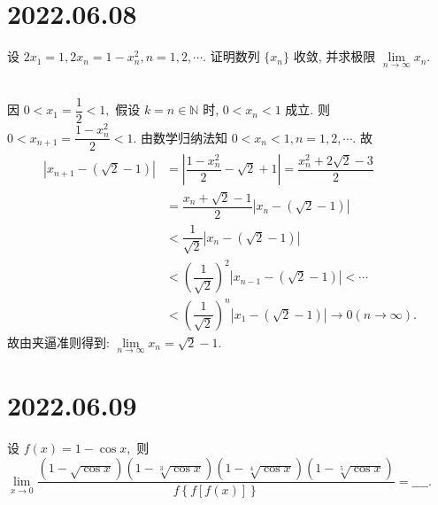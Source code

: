 \documentclass[lang=cn,12pt]{elegantbook}
\begin{document}
\newpage

\section*{2022.06.08}

设 $2x_{1} = 1, 2x_{n} = 1-x_{n}^2, n = 1, 2, \cdots.$
证明数列 $\{x_{n}\}$ 收敛, 并求极限 $\lim\limits_{n\to\infty} x_{n}.$
\\ \\

\begin{solution}
  因 $0 < x_{1} = \dfrac{1}{2} < 1,$ 假设 $k=n\in\mathbb{N}$ 时,
  $0 < x_{n} < 1$ 成立. 则 $0 < x_{n+1} = \dfrac{1-x_{n}^2}{2} < 1.$
  由数学归纳法知 $0 < x_{n} < 1, n = 1, 2, \cdots.$ 故
  $$\begin{aligned}
    \left| x_{n+1} - \left(\sqrt{2} - 1\right)\right| &=
    \left| \dfrac{1-x_{n}^2}{2} - \sqrt{2} + 1\right| = 
    \dfrac{x_{n}^2 + 2\sqrt{2} - 3}{2} \\ &= 
    \dfrac{x_{n} + \sqrt{2} - 1}{2}\left| x_{n} - \left(\sqrt{2} - 1\right)\right| \\ &<
    \dfrac{1}{\sqrt{2}}\left| x_{n} - \left(\sqrt{2} - 1\right)\right| \\ &<
    \left(\dfrac{1}{\sqrt{2}}\right)^2\left| x_{n-1} - \left(\sqrt{2} - 1\right)\right| < \cdots \\ & <
    \left(\dfrac{1}{\sqrt{2}}\right)^n\left| x_{1} - \left(\sqrt{2} - 1\right)\right| \to 0 (n\to\infty).
  \end{aligned}
  $$
  故由夹逼准则得到: $\lim\limits_{n\to\infty} x_{n} = \sqrt{2} - 1.$
\end{solution}

\newpage

\section*{2022.06.09}

设 $f(x) = 1 - \cos x,$ 则 $\lim\limits_{x \to 0} 
  \dfrac{\left(1-\sqrt{\cos x}\right)\left(1-\sqrt[3]{\cos x}\right)
  \left(1-\sqrt[4]{\cos x}\right)\left(1-\sqrt[5]{\cos x}\right)}
  {f\left\{f\left[f\left(x\right)\right]\right\}}=\_\_\_\_.$
\\ \\
\end{document}
